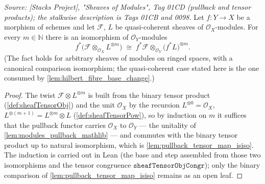 \begin{lemma}
  \label{lem:pullback_moduleTensorPow}
  \textit{Source: [Stacks Project], "Sheaves of Modules", Tag 01CD (pullback
  and tensor products); the stalkwise description is Tags 01CB and 0098.}
  Let \(f : Y \to X\) be a morphism of schemes and let \(\mathcal{F}\), \(L\)
  be quasi-coherent sheaves of \(\mathcal{O}_X\)-modules.  For every
  \(m \in \mathbb{N}\) there is an isomorphism of \(\mathcal{O}_Y\)-modules
  \[
    f^*\bigl(\mathcal{F} \otimes_{\mathcal{O}_X} L^{\otimes m}\bigr)
    \;\cong\;
    f^*\mathcal{F} \otimes_{\mathcal{O}_Y} \bigl(f^*L\bigr)^{\otimes m}.
  \]
  (The fact holds for arbitrary sheaves of modules on ringed spaces, with a
  canonical comparison isomorphism; the quasi-coherent case stated here is
  the one consumed by \cref{lem:hilbert_fibre_base_change}.)
\end{lemma}
\begin{proof}
  The twist \(\mathcal{F} \otimes L^{\otimes m}\) is built from the binary
  tensor product (\cref{def:sheafTensorObj}) and the unit
  \(\mathcal{O}_X\) by the recursion \(L^{\otimes 0} = \mathcal{O}_X\),
  \(L^{\otimes (m+1)} = L^{\otimes m} \otimes L\)
  (\cref{def:sheafTensorPow}), so by induction on \(m\) it suffices that the
  pullback functor carries \(\mathcal{O}_X\) to \(\mathcal{O}_Y\) — the
  unitality of \cref{lem:modules_pullback_mathlib} — and commutes with the
  binary tensor product up to natural isomorphism, which is
  \cref{lem:pullback_tensor_map_isiso}.  The induction is carried out in Lean
  (the base and step assembled from those two isomorphisms and the tensor
  congruence \(\texttt{sheafTensorObjCongr}\)); only the binary comparison of
  \cref{lem:pullback_tensor_map_isiso} remains as an open leaf.
\end{proof}

